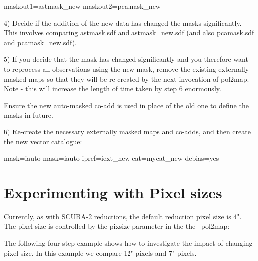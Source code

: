 \begin{terminalv}
maskout1=astmask_new           maskout2=pcamask_new
\end{terminalv}


4) Decide if the addition of the new data has changed the masks significantly. This involves
comparing astmask.sdf and astmask\_new.sdf (and also pcamask.sdf and
pcamask\_new.sdf).


5) If you decide that the mask has changed significantly and you therefore want to
reprocess all observations using the new mask, remove the existing externally-masked
maps so that they will be re-created by the next invocation of pol2map.  Note - this will
increase the length of time taken by step 6 enormously.

Ensure the new auto-masked co-add is used in place of the old one to define the masks in future.

\begin{terminalv}
\end{terminalv}

6) Re-create the necessary externally masked maps and co-adds, and then create the new
vector catalogue:

\begin{terminalv}
     mask=iauto
     mask=iauto ipref=iext_new cat=mycat_new debias=yes
\end{terminalv}

\section{Experimenting with Pixel sizes}

Currently, as with SCUBA-2 reductions, the default reduction pixel size is 4".
The pixel size is controlled by the pixsize parameter in the the \smurf\ pol2map:

\begin{terminalv}
\end{terminalv}


The following four step example shows how to investigate the impact of changing pixel size.
In this example we compare 12" pixels and 7" pixels.



